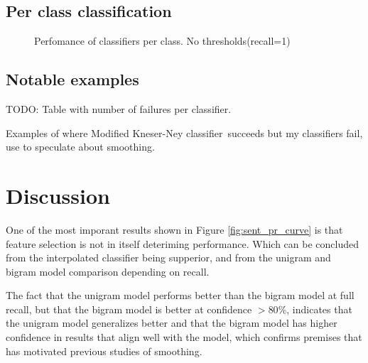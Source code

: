 \documentclass[a4paper,11pt]{kth-mag}
\newcommand{\ysc}{Modified Kneser-Ney classifier}
\begin{document}
\subsection{Per class classification}
\begin{figure}[h]
  \centering
  \caption{Perfomance of classifiers per class. No thresholds(recall=1)}
  \label{fig:sent_per_cat}
\end{figure}


\subsection{Notable examples}
TODO: Table with number of failures per classifier.

Examples of where \ysc~succeeds but my classifiers fail, use to speculate about smoothing.


\newpage
\section{Discussion}

One of the most imporant results shown in Figure \ref{fig:sent_pr_curve} is that feature selection is not in itself deteriming performance.  Which can be concluded from the interpolated classifier being supperior, and from the unigram and bigram model comparison depending on recall.

The fact that the unigram model performs better than the bigram model at full recall, but that the bigram model is better at confidence $>80\%$, indicates that the unigram model generalizes better and that the bigram model has higher confidence in results that align well with the model, which confirms premises that has motivated previous studies of smoothing.
\end{document}
